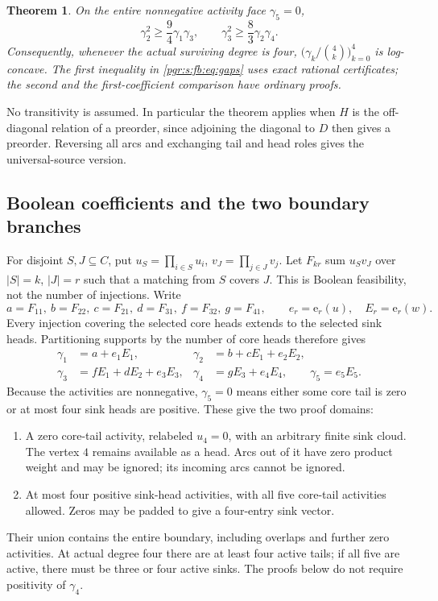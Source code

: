 \documentclass[11pt]{article}
\numberwithin{equation}{section}
\newtheorem{theorem}{Theorem}[section]\newtheorem{lemma}[theorem]{Lemma}\newtheorem{proposition}[theorem]{Proposition}\newtheorem{corollary}[theorem]{Corollary}
\theoremstyle{definition}\newtheorem{definition}[theorem]{Definition}\newtheorem{remark}[theorem]{Remark}
\newcommand{\ee}{\mathrm e}                %
\begin{document}
\begin{theorem}\label{pgr:s:fb:thm:main}
On the entire nonnegative activity face $\gamma_5=0$,
\begin{equation}\label{pgr:s:fb:eq:gaps}
 \gamma_2^2\ge\frac94\gamma_1\gamma_3,
 \qquad \gamma_3^2\ge\frac83\gamma_2\gamma_4.
\end{equation}
Consequently, whenever the actual surviving degree is four,
$\bigl(\gamma_k/\binom4k\bigr)_{k=0}^4$ is log-concave.
The first inequality in \eqref{pgr:s:fb:eq:gaps} uses exact rational certificates; the second and the first-coefficient comparison have ordinary proofs.
\end{theorem}

No transitivity is assumed. In particular the theorem applies when $H$ is the off-diagonal relation of a preorder, since adjoining the diagonal to $D$ then gives a preorder. Reversing all arcs and exchanging tail and head roles gives the universal-source version.

\subsection{Boolean coefficients and the two boundary branches}
For disjoint $S,J\subseteq C$, put $u_S=\prod_{i\in S}u_i$, $v_J=\prod_{j\in J}v_j$. Let $F_{kr}$ sum $u_Sv_J$ over $|S|=k$, $|J|=r$ such that a matching from $S$ covers $J$. This is Boolean feasibility, not the number of injections. Write
\[
 a=F_{11},\ b=F_{22},\ c=F_{21},\ d=F_{31},\ f=F_{32},\ g=F_{41},
 \qquad e_r=\ee_r(u),\quad E_r=\ee_r(w).
\]
Every injection covering the selected core heads extends to the selected sink heads. Partitioning supports by the number of core heads therefore gives
\begin{equation}\label{pgr:s:fb:eq:coeff}
\begin{aligned}
 \gamma_1&=a+e_1E_1,& \gamma_2&=b+cE_1+e_2E_2,\\
 \gamma_3&=fE_1+dE_2+e_3E_3,&
 \gamma_4&=gE_3+e_4E_4,\qquad \gamma_5=e_5E_5.
\end{aligned}
\end{equation}
Because the activities are nonnegative, $\gamma_5=0$ means either some core tail is zero or at most four sink heads are positive. These give the two proof domains:
\begin{enumerate}
\item A zero core-tail activity, relabeled $u_4=0$, with an arbitrary finite sink cloud. The vertex $4$ remains available as a head. Arcs out of it have zero product weight and may be ignored; its incoming arcs cannot be ignored.
\item At most four positive sink-head activities, with all five core-tail activities allowed. Zeros may be padded to give a four-entry sink vector.
\end{enumerate}
Their union contains the entire boundary, including overlaps and further zero activities. At actual degree four there are at least four active tails; if all five are active, there must be three or four active sinks. The proofs below do not require positivity of $\gamma_4$.
\end{document}
